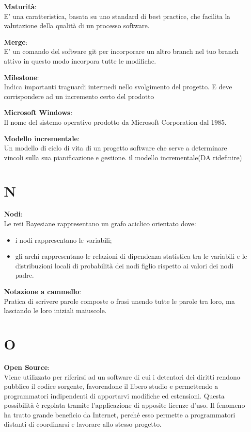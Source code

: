 \documentclass[a4paper, oneside, openany, dvipsnames, table]{article}
\begin{document}
\textbf{Maturità}:\\	E' una caratteristica, basata su uno standard di best practice, che facilita la valutazione della qualità di un processo software. 

\textbf{Merge}:\\	E' un comando del software git per incorporare un altro branch nel tuo branch attivo in questo modo incorpora tutte le modifiche.

\textbf{Milestone}:\\	Indica importanti traguardi intermedi nello svolgimento del progetto. E deve corrispondere ad un incremento certo del prodotto

\textbf{Microsoft Windows}:\\ Il nome del sistemo operativo prodotto da Microsoft Corporation dal 1985.

\textbf{Modello incrementale}:\\ Un modello di ciclo di vita di un progetto software che serve a determinare vincoli sulla sua pianificazione e gestione. il modello incrementale(DA ridefinire)


\newpage
\section{N}
\textbf{Nodi}:\\	Le reti Bayesiane rappresentano un grafo aciclico orientato dove:
\begin{itemize}
\item i nodi rappresentano le variabili;
\item gli archi rappresentano le relazioni di dipendenza statistica tra le variabili e le distribuzioni locali di probabilità dei nodi figlio rispetto ai valori dei nodi padre.
\end{itemize}

\textbf{Notazione a cammello}:\\	Pratica di scrivere parole composte o frasi unendo tutte le parole tra loro, ma lasciando le loro iniziali maiuscole.

\newpage
\section{O}
\textbf{Open Source}:\\	Viene utilizzato per riferirsi ad un software di cui i detentori dei diritti rendono pubblico il codice sorgente, favorendone il libero studio e permettendo a programmatori indipendenti di apportarvi modifiche ed estensioni. Questa possibilità è regolata tramite l'applicazione di apposite licenze d'uso. Il fenomeno ha tratto grande beneficio da Internet, perché esso permette a programmatori distanti di coordinarsi e lavorare allo stesso progetto.
\end{document}
